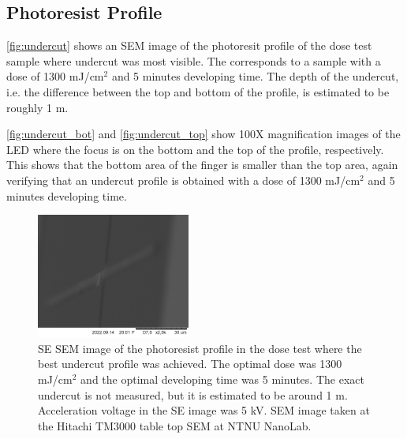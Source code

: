 
\subsection{Photoresist Profile}

\autoref{fig:undercut} shows an SEM image of the photoresit profile of the dose test sample where undercut was most visible.
The corresponds to a sample with a dose of 1300 mJ/cm$^2$ and 5 minutes developing time.
The depth of the undercut, i.e. the difference between the top and bottom of the profile, is estimated to be roughly 1 \textmu m.

\autoref{fig:undercut_bot} and \autoref{fig:undercut_top} show 100X magnification images of the LED where the focus is on the bottom and the top of the profile, respectively.
This shows that the bottom area of the finger is smaller than the top area, again verifying that an undercut profile is obtained with a dose of 1300 mJ/cm$^2$ and 5 minutes developing time.

\begin{figure}[ht]
    \centering
    \includegraphics[width=0.45\textwidth]{figures/Undercut_5min_1200mJcm-2.jpg}
    \caption{
        SE SEM image of the photoresist profile in the dose test where the best undercut profile was achieved.
        The optimal dose was 1300 mJ/cm$^2$ and the optimal developing time was 5 minutes.
        The exact undercut is not measured, but it is estimated to be around 1 \textmu m.
        Acceleration voltage in the SE image was 5 kV.
        SEM image taken at the Hitachi TM3000 table top SEM at NTNU NanoLab.
    }
    \label{fig:undercut}
\end{figure}

